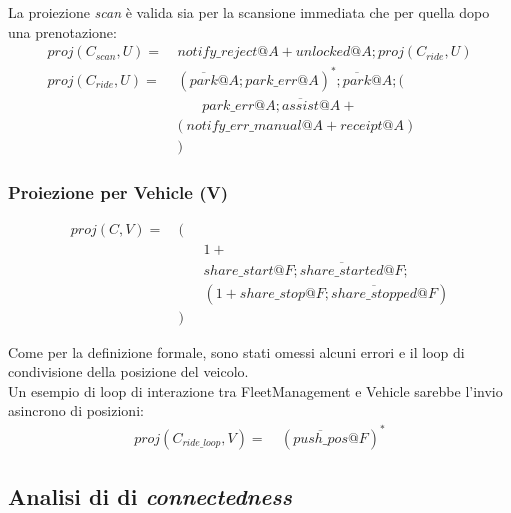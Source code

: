 La proiezione \textit{scan} è valida sia per la scansione immediata che per
quella dopo una prenotazione:\\
\begin{align*}
proj(C_{scan}, U) = & \ notify\_reject@A + unlocked@A ; proj(C_{ride}, U) \\
proj(C_{ride}, U) = & \ (\overline{park}@A ; park\_err@A )^* ; \overline{park}@A ; ( \\
& \quad \quad park\_err@A ; \overline{assist}@A + \\
& (notify\_err\_manual@A + receipt@A) \\
& \ )
\end{align*}

\subsubsection{Proiezione per Vehicle (V)}
\begin{align*}
    proj(C, V) = & \ ( \\
    & \quad \quad 1 + \\
    & \quad \quad share\_start@F ; \overline{share\_started}@F ; \\
    & \quad \quad ( 1 + share\_stop@F ; \overline{share\_stopped}@F ) \\
    & \ )
\end{align*}

Come per la definizione formale, sono stati omessi alcuni errori e il loop di
condivisione della posizione del veicolo.\\
Un esempio di loop di interazione tra FleetManagement e Vehicle sarebbe l'invio
asincrono di posizioni:\\
\begin{align*}
proj(C_{ride\_loop}, V) = & \ {( \overline{push\_pos}@F )}^*
\end{align*}



\subsection{Analisi di di \textit{connectedness}}

